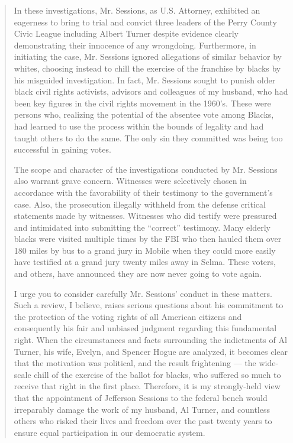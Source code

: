 \begin{quote}
In these investigations, Mr. Sessions, as U.S. Attorney, exhibited an
eagerness to bring to trial and convict three leaders of the Perry
County Civic League including Albert Turner despite evidence clearly
demonstrating their innocence of any wrongdoing. Furthermore, in
initiating the case, Mr. Sessions ignored allegations of similar
behavior by whites, choosing instead to chill the exercise of the
franchise by blacks by his misguided investigation. In fact, Mr.
Sessions sought to punish older black civil rights activists, advisors
and colleagues of my husband, who had been key figures in the civil
rights movement in the 1960's. These were persons who, realizing the
potential of the absentee vote among Blacks, had learned to use the
process within the bounds of legality and had taught others to do the
same. The only sin they committed was being too successful in gaining
votes.

The scope and character of the investigations conducted by Mr. Sessions
also warrant grave concern. Witnesses were selectively chosen in
accordance with the favorability of their testimony to the government's
case. Also, the prosecution illegally withheld from the defense critical
statements made by witnesses. Witnesses who did testify were pressured
and intimidated into submitting the ``correct'' testimony. Many elderly
blacks were visited multiple times by the FBI who then hauled them over
180 miles by bus to a grand jury in Mobile when they could more easily
have testified at a grand jury twenty miles away in Selma. These voters,
and others, have announced they are now never going to vote again.

I urge you to consider carefully Mr. Sessions' conduct in these matters.
Such a review, I believe, raises serious questions about his commitment
to the protection of the voting rights of all American citizens and
consequently his fair and unbiased judgment regarding this fundamental
right. When the circumstances and facts surrounding the indictments of
Al Turner, his wife, Evelyn, and Spencer Hogue are analyzed, it becomes
clear that the motivation was political, and the result frightening ---
the wide-scale chill of the exercise of the ballot for blacks, who
suffered so much to receive that right in the first place. Therefore, it
is my strongly-held view that the appointment of Jefferson Sessions to
the federal bench would irreparably damage the work of my husband, Al
Turner, and countless others who risked their lives and freedom over the
past twenty years to ensure equal participation in our democratic
system.


\end{quote}
